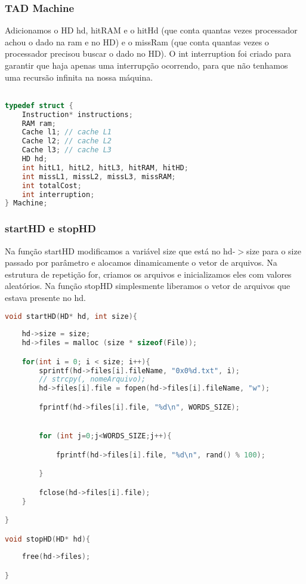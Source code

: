 \documentclass{article}
\begin{document}
\subsubsection{TAD Machine}

Adicionamos o HD hd, hitRAM e o hitHd (que conta quantas vezes processador achou o dado na ram e no HD) e o missRam (que conta quantas vezes o processador precisou buscar o dado no HD).
O int interruption foi criado para garantir que haja apenas uma interrupção ocorrendo, para que não tenhamos uma recursão infinita na nossa máquina.

\begin{lstlisting}[caption={TAD Machine},label={lst:cod2},language=C]

typedef struct {
    Instruction* instructions;
    RAM ram;
    Cache l1; // cache L1
    Cache l2; // cache L2
    Cache l3; // cache L3
    HD hd;
    int hitL1, hitL2, hitL3, hitRAM, hitHD;
    int missL1, missL2, missL3, missRAM;
    int totalCost;
    int interruption;
} Machine;

\end{lstlisting}

\subsubsection{startHD e stopHD}

Na função startHD modificamos a variável size que está no hd-$>$size para o size passado por parâmetro e alocamos dinamicamente o vetor de arquivos.
Na estrutura de repetição for, criamos os arquivos e inicializamos eles com valores aleatórios.
Na função stopHD simplesmente liberamos o vetor de arquivos que estava presente no hd.

\begin{lstlisting}[caption={Funçao run},label={lst:cod3},language=C]
void startHD(HD* hd, int size){
    
    hd->size = size;
    hd->files = malloc (size * sizeof(File));

    for(int i = 0; i < size; i++){
        sprintf(hd->files[i].fileName, "0x0%d.txt", i);
        // strcpy(, nomeArquivo);
        hd->files[i].file = fopen(hd->files[i].fileName, "w");

        fprintf(hd->files[i].file, "%d\n", WORDS_SIZE);


        for (int j=0;j<WORDS_SIZE;j++){

            fprintf(hd->files[i].file, "%d\n", rand() % 100);

        }

        fclose(hd->files[i].file);
    }

}

void stopHD(HD* hd){
    
    free(hd->files);

} 
        
\end{lstlisting}
\end{document}
